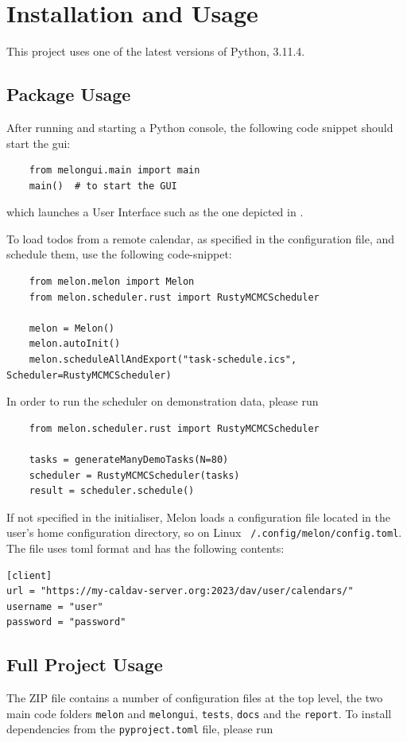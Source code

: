 \documentclass{prettytex/ox/mmsc-special-topic}
\begin{document}
  \pagebreak
  \section{Installation and Usage}
  This project uses one of the latest versions of Python, 3.11.4.

  \subsection{Package Usage}
  After running  and starting a Python console, the following code snippet should start the \gls{gui}:

  \begin{verbatim}
    from melongui.main import main
    main()  # to start the GUI
  \end{verbatim}

  which launches a User Interface such as the one depicted in .

  To load todos from a remote calendar, as specified in the configuration file, and schedule them, use the following code-snippet:
  \begin{verbatim}
    from melon.melon import Melon
    from melon.scheduler.rust import RustyMCMCScheduler

    melon = Melon()
    melon.autoInit()
    melon.scheduleAllAndExport("task-schedule.ics", Scheduler=RustyMCMCScheduler)
  \end{verbatim}

  In order to run the scheduler on demonstration data, please run
  \begin{verbatim}
    from melon.scheduler.rust import RustyMCMCScheduler

    tasks = generateManyDemoTasks(N=80)
    scheduler = RustyMCMCScheduler(tasks)
    result = scheduler.schedule()
  \end{verbatim}

  If not specified in the initialiser, Melon loads a configuration file located in the user's home configuration directory, so on Linux \texttt{~/.config/melon/config.toml}.
  The file uses \gls{toml} format and has the following contents:
  \begin{verbatim}
[client]
url = "https://my-caldav-server.org:2023/dav/user/calendars/"
username = "user"
password = "password"
  \end{verbatim}

  \subsection{Full Project Usage}
  The ZIP file contains a number of configuration files at the top level, the two main code folders \texttt{melon} and \texttt{melongui}, \texttt{tests}, \texttt{docs} and the \texttt{report}.
  To install dependencies from the \texttt{pyproject.toml} file, please run
\end{document}
